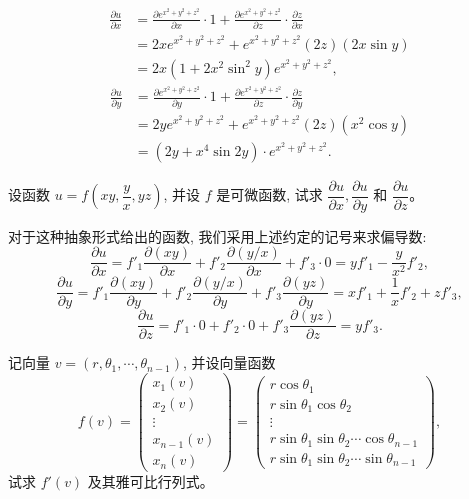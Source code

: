 \documentclass[12pt,fontset=fandol]{ctexart}
\begin{document}
\begin{solve}\quad
\[
\begin{aligned}
  \frac{\partial u}{\partial x}
  &=\frac{\partial e^{x^2+y^2+z^2}}{\partial x}\cdot1
  +\frac{\partial e^{x^2+y^2+z^2}}{\partial z}\cdot\frac{\partial z}{\partial x}\\
  &=2xe^{x^2+y^2+z^2}+e^{x^2+y^2+z^2}(2z)(2x\sin y)\\
  &=2x(1+2x^2\sin^2 y)e^{x^2+y^2+z^2},
\end{aligned}
\]
\[
\begin{aligned}
  \frac{\partial u}{\partial y}
  &=\frac{\partial e^{x^2+y^2+z^2}}{\partial y}\cdot1
  +\frac{\partial e^{x^2+y^2+z^2}}{\partial z}\cdot\frac{\partial z}{\partial y}\\
  &=2ye^{x^2+y^2+z^2}+e^{x^2+y^2+z^2}(2z)(x^2\cos y)\\
  &=(2y+x^4\sin2y)\cdot e^{x^2+y^2+z^2}.
\end{aligned}
\]

\end{solve}
\begin{example}\label{course-example-14-2-2}\quad 设函数 $u=f\left(xy,\dfrac yx,yz\right)$, 并设 $f$ 是可微函数, 试求 $\dfrac{\partial u}{\partial x}, \dfrac{\partial u}{\partial y}$ 和 $\dfrac{\partial u}{\partial z}$。

\end{example}
\begin{solve}\quad 对于这种抽象形式给出的函数, 我们采用上述约定的记号来求偏导数:
\[
  \frac{\partial u}{\partial x}
  =f'_1\frac{\partial(xy)}{\partial x}+f'_2\frac{\partial(y/x)}{\partial x}+f'_3\cdot0
  =yf'_1-\frac{y}{x^2}f'_2,
\]
\[
  \frac{\partial u}{\partial y}
  =f'_1\frac{\partial(xy)}{\partial y}
  +f'_2\frac{\partial(y/x)}{\partial y}
  +f'_3\frac{\partial(yz)}{\partial y}
  =xf'_1+\frac1x f'_2+zf'_3,
\]
\[
  \frac{\partial u}{\partial z}
  =f'_1\cdot0+f'_2\cdot0+f'_3\frac{\partial(yz)}{\partial z}
  =yf'_3.
\]

\end{solve}
\begin{example}\label{course-example-14-2-3}\quad 记向量 $v=(r,\theta_1,\cdots,\theta_{n-1})$, 并设向量函数
\[
  f(v)=
  \begin{pmatrix}
    x_1(v)\\
    x_2(v)\\
    \vdots\\
    x_{n-1}(v)\\
    x_n(v)
  \end{pmatrix}
  =
  \begin{pmatrix}
    r\cos\theta_1\\
    r\sin\theta_1\cos\theta_2\\
    \vdots\\
    r\sin\theta_1\sin\theta_2\cdots\cos\theta_{n-1}\\
    r\sin\theta_1\sin\theta_2\cdots\sin\theta_{n-1}
  \end{pmatrix},
\]
试求 $f'(v)$ 及其雅可比行列式。

\end{example}
\end{document}
